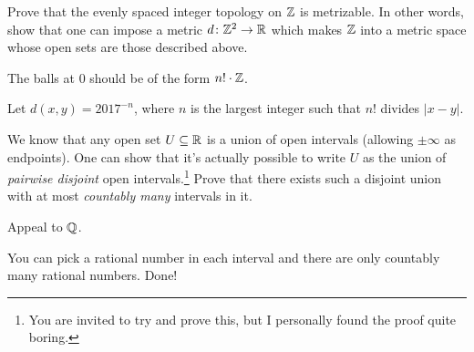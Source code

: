 \begin{problem}
	\gim
	Prove that the evenly spaced integer topology on $\mathbb Z$ is metrizable.
	In other words, show that one can impose a metric $d \colon \mathbb Z^2 \to \mathbb R$
	which makes $\mathbb Z$ into a metric space whose open sets are those described above.
	\begin{hint}
		The balls at $0$ should be of the form $n! \cdot \mathbb Z$.
	\end{hint}
	\begin{sol}
		Let $d(x,y) = 2017^{-n}$,
		where $n$ is the largest integer
		such that $n!$ divides $\left\lvert x-y \right\rvert$.
	\end{sol}
\end{problem}


\begin{problem}
	\gim
	We know that any open set $U \subseteq \mathbb R$
	is a union of open intervals (allowing $\pm\infty$ as endpoints).
	One can show that it's actually possible to write $U$ as the
	union of \emph{pairwise disjoint} open intervals.\footnote{You are invited to try
	and prove this, but I personally found the proof quite boring.}
	Prove that there exists such a disjoint union with at most \emph{countably many}
	intervals in it.
	\begin{hint}
		Appeal to $\mathbb Q$.
	\end{hint}
	\begin{sol}
		You can pick a rational number in each interval and
		there are only countably many rational numbers. Done!
	\end{sol}
\end{problem}
